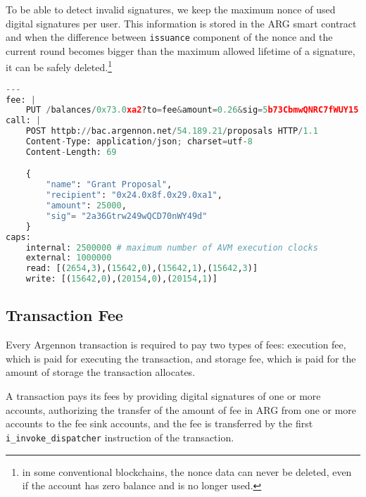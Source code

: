 To be able to detect invalid signatures, we keep the maximum nonce of used digital signatures per user. This information
is stored in the ARG smart contract and when the difference between \texttt{issuance} component of the nonce and
the current round becomes bigger than the maximum allowed lifetime of a signature, it can be safely
deleted.\footnote{in some conventional
blockchains, the nonce data can never be deleted, even if the account has zero balance and is no longer used.}


\begin{lstlisting}[language=python, frame=TB, float, title=An Argennon transaction in YAML format,label={lst:txn-example}]
---
fee: |
    PUT /balances/0x73.0xa2?to=fee&amount=0.26&sig=5b73CbmwQNRC7fWUY15 HTTP/1.1
call: |
    POST httpb://bac.argennon.net/54.189.21/proposals HTTP/1.1
    Content-Type: application/json; charset=utf-8
    Content-Length: 69

    {
        "name": "Grant Proposal",
        "recipient": "0x24.0x8f.0x29.0xa1",
        "amount": 25000,
        "sig"= "2a36Gtrw249wQCD70nWY49d"
    }
caps:
    internal: 2500000 # maximum number of AVM execution clocks
    external: 1000000
    read: [(2654,3),(15642,0),(15642,1),(15642,3)]
    write: [(15642,0),(20154,0),(20154,1)]
\end{lstlisting}

\subsection{Transaction Fee}\label{subsec:fee}

Every Argennon transaction is required to pay two types of fees: execution fee, which is paid for executing the
transaction, and storage fee, which is paid for the amount of storage the transaction allocates.

A transaction pays
its fees by providing digital signatures of one or more accounts, authorizing the transfer of the amount of fee in
ARG from one or more accounts to the fee sink accounts, and the fee is transferred by the first
\texttt{i\_invoke\_dispatcher} instruction of the transaction.


